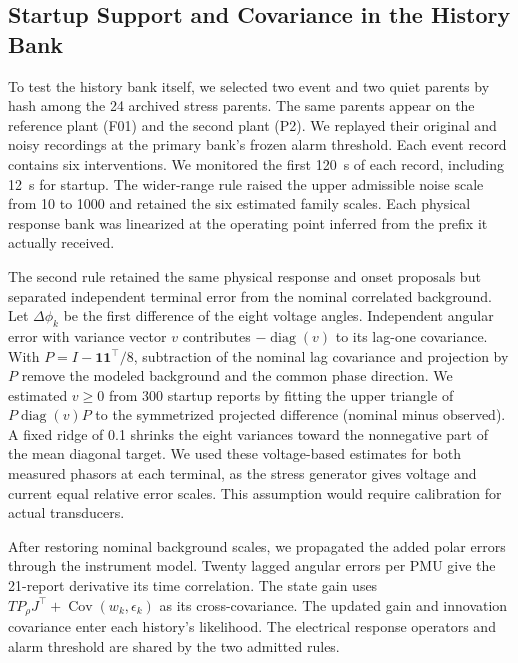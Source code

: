 \subsection{Startup Support and Covariance in the History Bank}
\label{app:pmu-history-noise}

To test the history bank itself, we selected two event and two quiet
parents by hash among the 24 archived stress parents. The same parents
appear on the reference plant (F01) and the second plant (P2).
We replayed their original and noisy recordings
at the primary bank's frozen alarm threshold. Each event record
contains six interventions. We monitored the first 120~s of each
record, including 12~s for startup. The wider-range rule raised the
upper admissible noise scale from 10 to 1000 and retained the six
estimated family scales. Each physical response bank was linearized
at the operating point inferred from the prefix it actually received.

The second rule retained the same physical response and onset
proposals but separated independent terminal error from the nominal
correlated background. Let $\Delta\phi_k$ be the first difference of
the eight voltage angles. Independent angular error with variance
vector $v$ contributes $-\operatorname{diag}(v)$ to its lag-one
covariance. With $P=I-\mathbf{1}\mathbf{1}^{\top}/8$, subtraction of
the nominal lag covariance and projection by $P$ remove the modeled
background and the common phase direction. We estimated $v\geq0$ from
300 startup reports by fitting the upper triangle of
$P\operatorname{diag}(v)P$ to the symmetrized projected difference
(nominal minus observed). A fixed ridge of 0.1 shrinks the eight
variances toward the nonnegative part of the mean diagonal target. We used these
voltage-based estimates for both measured phasors at each terminal,
as the stress generator gives voltage and current equal relative
error scales. This assumption would require calibration for actual
transducers.

After restoring nominal background scales, we propagated the added
polar errors through the instrument model. Twenty lagged angular
errors per PMU give the 21-report derivative its time correlation.
The state gain uses $T P_\rho J^\top+
\operatorname{Cov}(w_k,\epsilon_k)$ as its cross-covariance.
The updated gain and innovation covariance enter each history's
likelihood. The electrical response operators and alarm threshold
are shared by the two admitted rules.

\begin{table}[t]\centering\small
\caption{History-bank replay on four paired parents per plant. Exact
counts correct family and asset before restoration among 12 interventions.
Extra counts unmatched event-record alarms. Quiet$^+$ counts alarms
in 0.06 monitored normal hours per admitted row. Dashes indicate zero
monitored exposure. On nominal recordings the original and wider ranges
admit the same bank and give identical decisions.}
\label{tab:pmu-noise-history}

\end{table}


